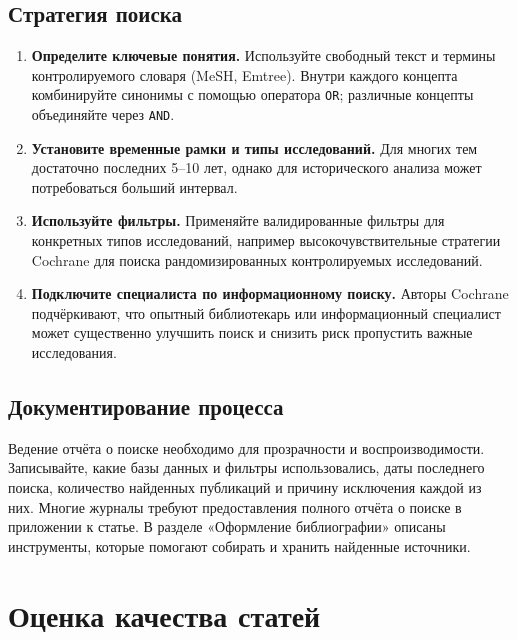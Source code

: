 \documentclass[
  russian,
  letterpaper,
]{book}
\providecommand{\tightlist}{%
  \setlength{\itemsep}{0pt}\setlength{\parskip}{0pt}}
\begin{document}
\section{Стратегия
поиска}\label{ux441ux442ux440ux430ux442ux435ux433ux438ux44f-ux43fux43eux438ux441ux43aux430}

\begin{enumerate}
\def\labelenumi{\arabic{enumi}.}
\tightlist
\item
  \textbf{Определите ключевые понятия.} Используйте свободный текст и
  термины контролируемого словаря (MeSH, Emtree). Внутри каждого
  концепта комбинируйте синонимы с помощью оператора \texttt{OR};
  различные концепты объединяйте через \texttt{AND}.
\item
  \textbf{Установите временные рамки и типы исследований.} Для многих
  тем достаточно последних 5--10 лет, однако для исторического анализа
  может потребоваться больший интервал.
\item
  \textbf{Используйте фильтры.} Применяйте валидированные фильтры для
  конкретных типов исследований, например высокочувствительные стратегии
  Cochrane для поиска рандомизированных контролируемых исследований.
\item
  \textbf{Подключите специалиста по информационному поиску.} Авторы
  Cochrane подчёркивают, что опытный библиотекарь или информационный
  специалист может существенно улучшить поиск и снизить риск пропустить
  важные исследования.
\end{enumerate}

\section{Документирование
процесса}\label{ux434ux43eux43aux443ux43cux435ux43dux442ux438ux440ux43eux432ux430ux43dux438ux435-ux43fux440ux43eux446ux435ux441ux441ux430}

Ведение отчёта о поиске необходимо для прозрачности и воспроизводимости.
Записывайте, какие базы данных и фильтры использовались, даты последнего
поиска, количество найденных публикаций и причину исключения каждой из
них. Многие журналы требуют предоставления полного отчёта о поиске в
приложении к статье. В разделе «Оформление библиографии» описаны
инструменты, которые помогают собирать и хранить найденные источники.

\chapter{Оценка качества
статей}\label{ux43eux446ux435ux43dux43aux430-ux43aux430ux447ux435ux441ux442ux432ux430-ux441ux442ux430ux442ux435ux439}
\end{document}
